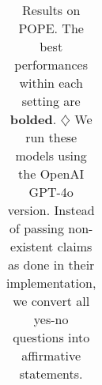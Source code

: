 \begin{table}[t]
\begin{center}
{\begin{tabular}{lcccc}
\end{tabular}
}


\caption{Results on POPE. The best performances within each setting are \textbf{bolded}. $\diamondsuit$ We run these models using the OpenAI GPT-4o version. Instead of passing non-existent claims as done in their implementation, we convert all yes-no questions into affirmative statements.}

\label{tab:main}
\end{center}

\vspace{-10pt}
\end{table}